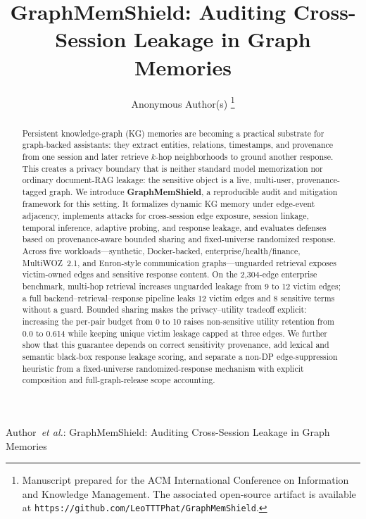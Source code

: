 \documentclass[journal,10pt,twocolumn]{IEEEtran}
\begin{document}
\title{GraphMemShield: Auditing Cross-Session Leakage in Graph Memories}

\author{Anonymous Author(s)
\thanks{Manuscript prepared for the ACM International Conference on
Information and Knowledge Management. The associated open-source artifact is
available at \texttt{https://github.com/LeoTTTPhat/GraphMemShield}.}}

%
{Author~\MakeLowercase{\textit{et al.}}: GraphMemShield: Auditing
Cross-Session Leakage in Graph Memories}

\maketitle

\begin{abstract}
Persistent knowledge-graph (KG) memories are becoming a practical
substrate for graph-backed assistants: they extract entities,
relations, timestamps, and provenance from one session and later
retrieve $k$-hop neighborhoods to ground another response. This
creates a privacy boundary that is neither standard model
memorization nor ordinary document-RAG leakage: the sensitive object
is a live, multi-user, provenance-tagged graph. We introduce
\textbf{GraphMemShield}, a reproducible audit and mitigation framework
for this setting. It formalizes dynamic KG memory under edge-event
adjacency, implements attacks for cross-session edge exposure,
session linkage, temporal inference, adaptive probing, and response
leakage, and evaluates defenses based on provenance-aware bounded
sharing and fixed-universe randomized response. Across five
workloads---synthetic, Docker-backed, enterprise/health/finance,
MultiWOZ~2.1, and Enron-style communication graphs---unguarded
retrieval exposes victim-owned edges and sensitive response content.
On the 2,304-edge enterprise benchmark, multi-hop retrieval increases
unguarded leakage from 9 to 12 victim edges; a full
backend--retrieval--response pipeline leaks 12 victim edges and 8
sensitive terms without a guard. Bounded sharing makes the
privacy--utility tradeoff explicit: increasing the per-pair budget
from 0 to 10 raises non-sensitive utility retention from 0.0 to 0.614
while keeping unique victim leakage capped at three edges. We further
show that this guarantee depends on correct sensitivity provenance,
add lexical and semantic black-box response leakage scoring, and
separate a non-DP edge-suppression heuristic from a fixed-universe
randomized-response mechanism with explicit composition and
full-graph-release scope accounting.
\end{abstract}
\end{document}
